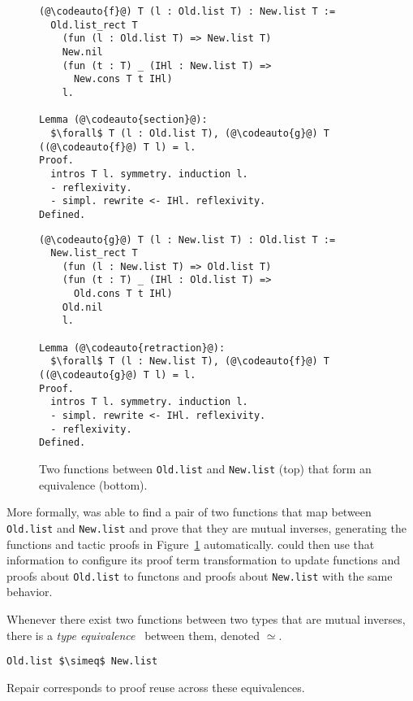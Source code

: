 \begin{figure}
\begin{minipage}{0.48\textwidth}
\begin{lstlisting}
(@\codeauto{f}@) T (l : Old.list T) : New.list T :=
  Old.list_rect T
    (fun (l : Old.list T) => New.list T)
    New.nil
    (fun (t : T) _ (IHl : New.list T) =>
      New.cons T t IHl)
    l.

Lemma (@\codeauto{section}@):
  $\forall$ T (l : Old.list T), (@\codeauto{g}@) T ((@\codeauto{f}@) T l) = l.
Proof.
  intros T l. symmetry. induction l.
  - reflexivity.
  - simpl. rewrite <- IHl. reflexivity.
Defined.
\end{lstlisting}
\end{minipage}
\hfill
\begin{minipage}{0.48\textwidth}
\begin{lstlisting}
(@\codeauto{g}@) T (l : New.list T) : Old.list T :=
  New.list_rect T
    (fun (l : New.list T) => Old.list T)
    (fun (t : T) _ (IHl : Old.list T) =>
      Old.cons T t IHl)
    Old.nil
    l.

Lemma (@\codeauto{retraction}@):
  $\forall$ T (l : New.list T), (@\codeauto{f}@) T ((@\codeauto{g}@) T l) = l.
Proof.
  intros T l. symmetry. induction l.
  - simpl. rewrite <- IHl. reflexivity.
  - reflexivity.
Defined.
\end{lstlisting}
\end{minipage}
\caption{Two functions between \lstinline{Old.list} and \lstinline{New.list} (top) that form an equivalence (bottom).}
\label{fig:equivalence}
\end{figure}

More formally, \toolname was able to find a pair of two functions that map between \lstinline{Old.list}
and \lstinline{New.list} and prove that they are mutual inverses, generating the functions and tactic
proofs in Figure~\ref{fig:equivalence} automatically.
\toolname could then use that information to configure its proof term transformation to update
functions and proofs about \lstinline{Old.list} to functons and proofs about \lstinline{New.list} with
the same behavior.

Whenever there exist two functions between two types that are mutual inverses,
there is a \textit{type equivalence}~\cite{univalent2013homotopy} between them, denoted $\simeq$.

\begin{lstlisting}
Old.list $\simeq$ New.list
\end{lstlisting}
Repair corresponds to proof reuse across these equivalences.

